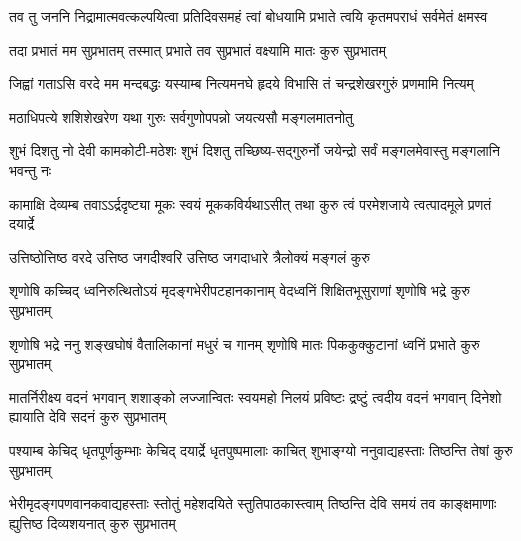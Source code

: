 

{तव तु जननि निद्रामात्मवत्कल्पयित्वा}
{प्रतिदिवसमहं त्वां बोधयामि प्रभाते}
{त्वयि कृतमपराधं सर्वमेतं क्षमस्व}

{तदा प्रभातं मम सुप्रभातम्}
{तस्मात् प्रभाते तव सुप्रभातं}
{वक्ष्यामि मातः कुरु सुप्रभातम्}

{जिह्वां गताऽसि वरदे मम मन्दबद्धः}
{यस्याम्ब नित्यमनघे हृदये विभासि}
{तं चन्द्रशेखरगुरुं प्रणमामि नित्यम्}

{मठाधिपत्ये शशिशेखरेण}
{यथा गुरुः सर्वगुणोपपन्नो}
{जयत्यसौ मङ्गलमातनोतु}

{शुभं दिशतु नो देवी कामकोटी-मठेशः}
{शुभं दिशतु तच्छिष्य-सद्गुरुर्नो जयेन्द्रो}
{सर्वं मङ्गलमेवास्तु मङ्गलानि भवन्तु नः}

\fourlineindentedshloka
{कामाक्षि देव्यम्ब तवाऽऽर्द्रदृष्ट्या}
{मूकः स्वयं मूककविर्यथाऽसीत्}
{तथा कुरु त्वं परमेशजाये}
{त्वत्पादमूले प्रणतं दयार्द्रे}

\twolineshloka
{उत्तिष्ठोत्तिष्ठ वरदे उत्तिष्ठ जगदीश्वरि}
{उत्तिष्ठ जगदाधारे त्रैलोक्यं मङ्गलं कुरु}

\fourlineindentedshloka
{शृणोषि कच्चिद् ध्वनिरुत्थितोऽयं}
{मृदङ्गभेरीपटहानकानाम्}
{वेदध्वनिं शिक्षितभूसुराणां}
{शृणोषि भद्रे कुरु सुप्रभातम्}

\fourlineindentedshloka
{शृणोषि भद्रे ननु शङ्खघोषं}
{वैतालिकानां मधुरं च गानम्}
{शृणोषि मातः पिककुक्कुटानां}
{ध्वनिं प्रभाते कुरु सुप्रभातम्}

\fourlineindentedshloka
{मातर्निरीक्ष्य वदनं भगवान् शशाङ्को}
{लज्जान्वितः स्वयमहो निलयं प्रविष्टः}
{द्रष्टुं त्वदीय वदनं भगवान् दिनेशो}
{ह्यायाति देवि सदनं कुरु सुप्रभातम्}

\fourlineindentedshloka
{पश्याम्ब केचिद् धृतपूर्णकुम्भाः}
{केचिद् दयार्द्रे धृतपुष्पमालाः}
{काचित् शुभाङ्ग्यो ननुवाद्यहस्ताः}
{तिष्ठन्ति तेषां कुरु सुप्रभातम्}

\fourlineindentedshloka
{भेरीमृदङ्गपणवानकवाद्यहस्ताः}
{स्तोतुं महेशदयिते स्तुतिपाठकास्त्वाम्}
{तिष्ठन्ति देवि समयं तव काङ्क्षमाणाः}
{ह्युत्तिष्ठ दिव्यशयनात् कुरु सुप्रभातम्}

